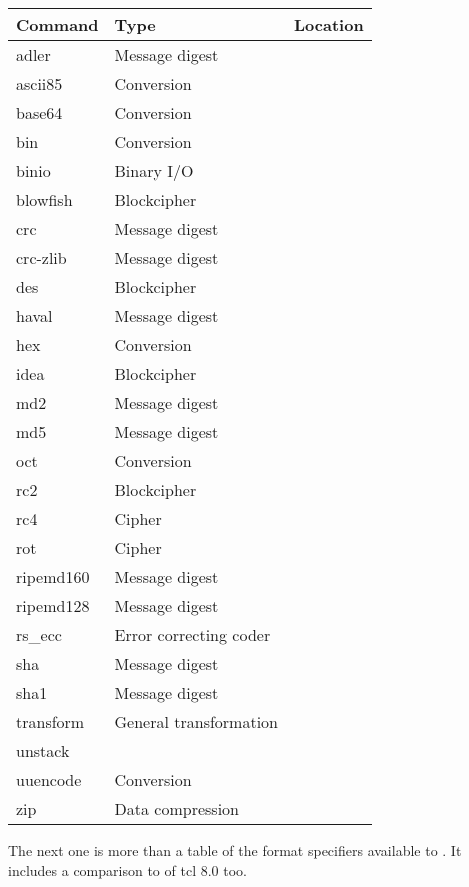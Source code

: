 \documentclass {report}
\begin{document}
\begin {center}
\begin {tabular}{|l|l|l|}\hline
	Command		& Type				& Location \\ \hline\hline
	adler		& Message digest		& \zlib	\\ \hline
	ascii85		& Conversion			& \trf	\\ \hline
	base64		& Conversion			& \trf	\\ \hline
	bin		& Conversion			& \trf	\\ \hline
	binio		& Binary I/O			& \trf	\\ \hline
	blowfish	& Blockcipher			& \trf	\\ \hline
	crc		& Message digest		& \trf	\\ \hline
	crc-zlib	& Message digest		& \zlib	\\ \hline
	des		& Blockcipher			& \SSLeay \\ \hline
	haval		& Message digest		& \trf	\\ \hline
	hex		& Conversion			& \trf	\\ \hline
	idea		& Blockcipher			& \trf	\\ \hline
	md2		& Message digest		& \SSLeay \\ \hline
	md5		& Message digest		& \trf	\\ \hline
	oct		& Conversion			& \trf	\\ \hline
	rc2		& Blockcipher			& \SSLeay \\ \hline
	rc4		& Cipher			& \trf	\\ \hline
	rot		& Cipher			& \trf	\\ \hline
	ripemd160	& Message digest		& \trf	\\ \hline
	ripemd128	& Message digest		& \trf	\\ \hline
	rs\_ecc		& Error correcting coder	& \trf	\\ \hline
	sha		& Message digest		& \trf	\\ \hline
	sha1		& Message digest		& \SSLeay \\ \hline
	transform	& General transformation	& \trf	\\ \hline
	unstack		&				& \trf	\\ \hline
	uuencode	& Conversion			& \trf	\\ \hline
	zip		& Data compression		& \zlib	\\ \hline
\end {tabular}
\end {center}

The next one is more than a table of the format specifiers available to
. It includes a comparison to  of tcl
8.0 too.
\end{document}
